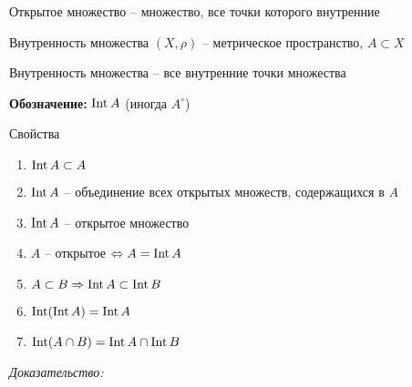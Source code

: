 \documentclass[12pt]{article}
\begin{document}
\begin{Remark}{}
    Открытое множество -- множество, все точки которого внутренние
\end{Remark}

\begin{defin}{Внутренность множества}
    $(X, \rho)$ -- метрическое пространство, $A \subset X$

    Внутренность множества -- все внутренние точки множества

    \textbf{Обозначение:} $\operatorname{Int} A$ (иногда $A^\circ$)
\end{defin}

\begin{theo}{Свойства}
    \begin{enumerate}
        \item $\operatorname{Int} A \subset A$
        \item $\operatorname{Int} A$ -- объединение всех открытых множеств, содержащихся в $A$
        \item $\operatorname{Int} A$ -- открытое множество
        \item $A$ -- открытое $\Leftrightarrow A = \operatorname{Int} A$
        \item $A \subset B \Rightarrow \operatorname{Int} A \subset \operatorname{Int} B$
        \item $\operatorname{Int} (\operatorname{Int} A) = \operatorname{Int} A$
        \item $\operatorname{Int} (A \cap B) = \operatorname{Int} A \cap \operatorname{Int} B$
    \end{enumerate}
\end{theo}

\textit{Доказательство:}
\end{document}

